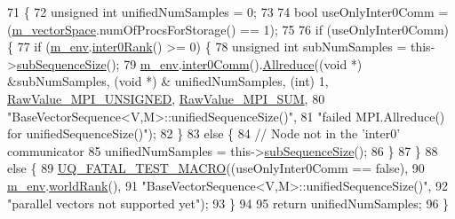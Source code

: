 \begin{DoxyCode}
71 \{
72   \textcolor{keywordtype}{unsigned} \textcolor{keywordtype}{int} unifiedNumSamples = 0;
73 
74   \textcolor{keywordtype}{bool} useOnlyInter0Comm = (\hyperlink{class_q_u_e_s_o_1_1_base_vector_sequence_a4bd171e39ed050ff105c808336f35198}{m\_vectorSpace}.numOfProcsForStorage() == 1);
75 
76   \textcolor{keywordflow}{if} (useOnlyInter0Comm) \{
77     \textcolor{keywordflow}{if} (\hyperlink{class_q_u_e_s_o_1_1_base_vector_sequence_a8e8824d2a63c5a43bcc6473e3a0491e8}{m\_env}.\hyperlink{class_q_u_e_s_o_1_1_base_environment_ae106b5bb8a80b655b88b3a26b1e7c185}{inter0Rank}() >= 0) \{
78       \textcolor{keywordtype}{unsigned} \textcolor{keywordtype}{int} subNumSamples = this->\hyperlink{class_q_u_e_s_o_1_1_base_vector_sequence_afd6278702d40bdf1044697bbd6ad1957}{subSequenceSize}();
79       \hyperlink{class_q_u_e_s_o_1_1_base_vector_sequence_a8e8824d2a63c5a43bcc6473e3a0491e8}{m\_env}.\hyperlink{class_q_u_e_s_o_1_1_base_environment_a689e4d140c74d495d97eb498714a4b82}{inter0Comm}().\hyperlink{class_q_u_e_s_o_1_1_mpi_comm_a72e137e60ef8060efb1ee5fc874fa4b8}{Allreduce}((\textcolor{keywordtype}{void} *) &subNumSamples, (\textcolor{keywordtype}{void} *) &
      unifiedNumSamples, (\textcolor{keywordtype}{int}) 1, \hyperlink{_mpi_comm_8h_a06cbfbc33436f6e0dc8a48ff3c49bdfc}{RawValue\_MPI\_UNSIGNED}, \hyperlink{_mpi_comm_8h_afbf78d291c032aa7f512bc566cee2bd1}{RawValue\_MPI\_SUM},
80                                    \textcolor{stringliteral}{"BaseVectorSequence<V,M>::unifiedSequenceSize()"},
81                                    \textcolor{stringliteral}{"failed MPI.Allreduce() for unifiedSequenceSize()"});
82     \}
83     \textcolor{keywordflow}{else} \{
84       \textcolor{comment}{// Node not in the 'inter0' communicator}
85       unifiedNumSamples = this->\hyperlink{class_q_u_e_s_o_1_1_base_vector_sequence_afd6278702d40bdf1044697bbd6ad1957}{subSequenceSize}();
86     \}
87   \}
88   \textcolor{keywordflow}{else} \{
89     \hyperlink{_defines_8h_a56d63d18d0a6d45757de47fcc06f574d}{UQ\_FATAL\_TEST\_MACRO}((useOnlyInter0Comm == \textcolor{keyword}{false}),
90                         \hyperlink{class_q_u_e_s_o_1_1_base_vector_sequence_a8e8824d2a63c5a43bcc6473e3a0491e8}{m\_env}.\hyperlink{class_q_u_e_s_o_1_1_base_environment_a78b57112bbd0e6dd0e8afec00b40ffa7}{worldRank}(),
91                         \textcolor{stringliteral}{"BaseVectorSequence<V,M>::unifiedSequenceSize()"},
92                         \textcolor{stringliteral}{"parallel vectors not supported yet"});
93   \}
94 
95   \textcolor{keywordflow}{return} unifiedNumSamples;
96 \}
\end{DoxyCode}
